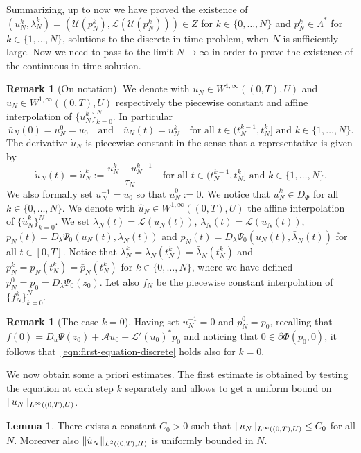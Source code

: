 \documentclass[a4paper,10pt,twoside]{amsbook}
\numberwithin{section}{chapter}
\numberwithin{equation}{chapter}
\theoremstyle{definition}
\newtheorem{lemma}[prop]{Lemma}
\newtheorem{rmk}[prop]{Remark}
\DeclarePairedDelimiter{\norm}{\lVert}{\rVert}
\begin{document}
Summarizing, up to now we have proved the existence of $(u_N^k,\lambda_N^k)=(\mathcal{U}(p_N^k),\mathcal{L}(\mathcal{U}(p_N^k)))\in Z$ for $k\in\{0,\dots,N\}$ and $p_N^k\in\Lambda^*$ for $k\in\{1,\dots,N\}$, solutions to the discrete-in-time problem, when $N$ is sufficiently large. Now we need to pass to the limit $N\to\infty$ in order to prove the existence of the continuous-in-time solution.
\begin{rmk}[On notation]
We denote with $\bar u_N\in W^{1,\infty}((0,T),U)$ and $u_N\in W^{1,\infty}((0,T),U)$ respectively the piecewise constant and affine interpolation of $\{u_N^k\}_{k=0}^N$. In particular
\[
\bar u_N(0)=u_N^0=u_0\quad\text{and}\quad\bar u_N(t)=u_N^k\quad\text{for all $t\in(t_N^{k-1},t_N^k]$ and $k\in\{1,\dots,N\}$}.
\] The derivative $\dot u_N$ is piecewise constant in the sense that a representative is given by
\[
\dot u_N(t)=\dot u_N^k:=\frac{u_N^k-u_N^{k-1}}{\tau_N}\quad\text{for all $t\in(t_N^{k-1},t_N^k]$ and $k\in\{1,\dots,N\}$}.
\]
We also formally set $u_N^{-1}=u_0$ so that $\dot u_N^0:=0$. We notice that $\dot u_N^k\in D_\Phi$ for all $k\in\{0,\dots,N\}$. We denote with $\hat u_N\in W^{1,\infty}((0,T),U)$ the affine interpolation of $\{\dot u_N^k\}_{k=0}^N$. We set $\lambda_N(t)=\mathcal{L}(u_N(t))$, $\bar\lambda_N(t)=\mathcal{L}(\bar u_N(t))$, $p_N(t)=D_\lambda\Psi_0(u_N(t),\lambda_N(t))$ and $\bar p_N(t)=D_\lambda\Psi_0(\bar u_N(t),\bar\lambda_N(t))$ for all $t\in[0,T]$. Notice that $\lambda_N^k=\lambda_N(t_N^k)=\bar\lambda_N(t_N^k)$ and $p_N^k=p_N(t_N^k)=\bar p_N(t_N^k)$ for $k\in\{0,\dots,N\}$, where we have defined $p_N^0=p_0=D_\lambda\Psi_0(z_0)$. Let also $\bar f_N$ be the piecewise constant interpolation of $\{f_N^k\}_{k=0}^N$.
\end{rmk}
\begin{rmk}[The case $k=0$]
Having set $u_N^{-1}=0$ and $p_N^0=p_0$, recalling that $f(0)=D_u\Psi(z_0)+\mathcal{A}u_0+\mathcal{L}'(u_0)^*p_0$ and noticing that $0\in\partial\Phi(p_0,0)$, it follows that~\eqref{eqn:first-equation-discrete} holds also for $k=0$.
\end{rmk}
We now obtain some a priori estimates. The first estimate is obtained by testing the equation at each step $k$ separately and allows to get a uniform bound on $\norm{u_N}_{L^\infty((0,T),U)}$.
\begin{lemma}
\label{lemma:a-priori-0}
There exists a constant $C_0>0$ such that $\norm{u_N}_{L^\infty((0,T),U)}\le C_0$ for all $N$. Moreover also $\norm{\dot u_N}_{L^2((0,T),H)}$ is uniformly bounded in $N$.
\end{lemma}
\end{document}
